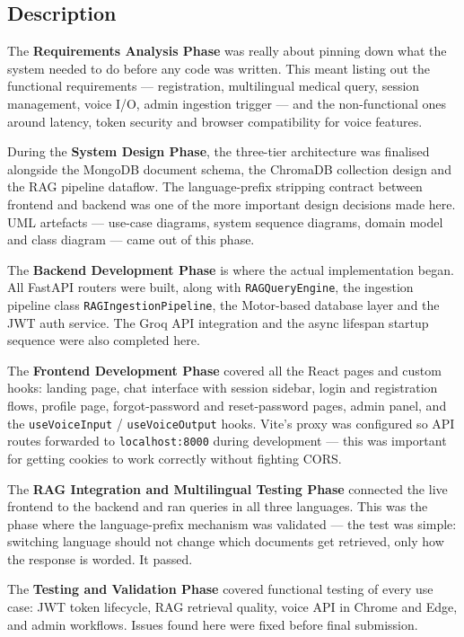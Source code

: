 \subsection{Description}

The \textbf{Requirements Analysis Phase} was really about pinning down what the system
needed to do before any code was written. This meant listing out the functional
requirements --- registration, multilingual medical query, session management, voice I/O,
admin ingestion trigger --- and the non-functional ones around latency, token security and
browser compatibility for voice features.

During the \textbf{System Design Phase}, the three-tier architecture was finalised
alongside the MongoDB document schema, the ChromaDB collection design and the RAG pipeline
dataflow. The language-prefix stripping contract between frontend and backend was one of
the more important design decisions made here. UML artefacts --- use-case diagrams, system
sequence diagrams, domain model and class diagram --- came out of this phase.

The \textbf{Backend Development Phase} is where the actual implementation began. All
FastAPI routers were built, along with \texttt{RAGQueryEngine}, the ingestion pipeline
class \texttt{RAGIngestionPipeline}, the Motor-based database layer and the JWT auth
service. The Groq API integration and the async lifespan startup sequence were also
completed here.

The \textbf{Frontend Development Phase} covered all the React pages and custom hooks:
landing page, chat interface with session sidebar, login and registration flows, profile
page, forgot-password and reset-password pages, admin panel, and the
\texttt{useVoiceInput} / \texttt{useVoiceOutput} hooks. Vite's proxy was configured so
API routes forwarded to \texttt{localhost:8000} during development --- this was important
for getting cookies to work correctly without fighting CORS.

The \textbf{RAG Integration and Multilingual Testing Phase} connected the live frontend
to the backend and ran queries in all three languages. This was the phase where the
language-prefix mechanism was validated --- the test was simple: switching language should
not change which documents get retrieved, only how the response is worded. It passed.

The \textbf{Testing and Validation Phase} covered functional testing of every use case:
JWT token lifecycle, RAG retrieval quality, voice API in Chrome and Edge, and admin
workflows. Issues found here were fixed before final submission.

